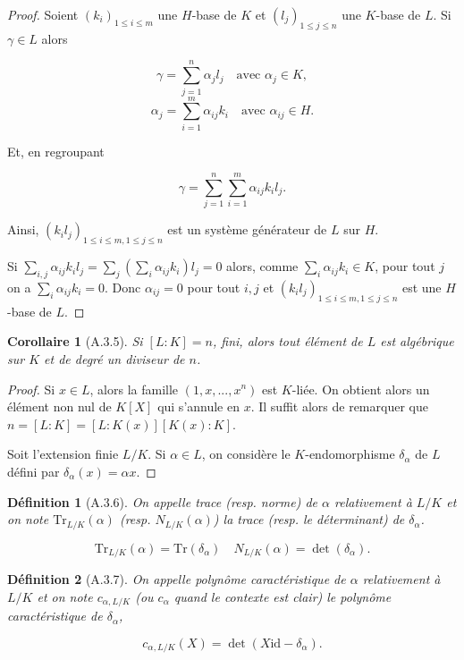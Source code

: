 \documentclass[12pts,a4paper]{report}
\newtheorem{definition}{Définition}
\newtheorem{corollaire}{Corollaire}
\begin{document}
\begin{proof}
Soient \( (k_i)_{1\leq i\leq m} \) une \( H \)-base de \( K \) et \( (l_j)_{1\leq j\leq n} \) une \( K \)-base de \( L \). Si \( \gamma \in L \) alors

\[
\gamma = \sum_{j=1}^n \alpha_j l_j \quad \text{avec } \alpha_j \in K,
\]
\[
\alpha_j = \sum_{i=1}^m \alpha_{ij} k_i \quad \text{avec } \alpha_{ij} \in H.
\]

Et, en regroupant

\[
\gamma = \sum_{j=1}^n \sum_{i=1}^m \alpha_{ij} k_i l_j.
\]

Ainsi, \( (k_i l_j)_{1\leq i\leq m, 1\leq j\leq n} \) est un système générateur de \( L \) sur \( H \).

Si \( \sum_{i,j} \alpha_{ij} k_i l_j = \sum_j (\sum_i \alpha_{ij} k_i) l_j = 0 \) alors, comme \( \sum_i \alpha_{ij} k_i \in K \), pour tout \( j \) on a \( \sum_i \alpha_{ij} k_i = 0 \). Donc \( \alpha_{ij} = 0 \) pour tout \( i, j \) et \( (k_i l_j)_{1\leq i\leq m, 1\leq j\leq n} \) est une \( H \)-base de \( L \). \qedhere
\end{proof}

\begin{corollaire}[A.3.5]
Si \( [L:K] = n \), fini, alors tout élément de \( L \) est algébrique sur \( K \) et de degré un diviseur de \( n \).
\end{corollaire}

\begin{proof}
Si \( x \in L \), alors la famille \( (1,x,...,x^n) \) est \( K \)-liée. On obtient alors un élément non nul de \( K[X] \) qui s'annule en \( x \). Il suffit alors de remarquer que \( n = [L:K] = [L:K(x)][K(x):K] \).

Soit l'extension finie \( L/K \). Si \( \alpha \in L \), on considère le \( K \)-endomorphisme \( \delta_\alpha \) de \( L \) défini par \( \delta_\alpha (x) = \alpha x \). \qedhere
\end{proof}

\begin{definition}[A.3.6]
On appelle trace (resp. norme) de \( \alpha \) relativement à \( L/K \) et on note \( \text{Tr}_{L/K}(\alpha) \) (resp. \( N_{L/K}(\alpha) \)) la trace (resp. le déterminant) de \( \delta_\alpha \).

\[
\text{Tr}_{L/K}(\alpha) = \text{Tr}(\delta_\alpha) \quad N_{L/K}(\alpha) = \det(\delta_\alpha).
\]
\end{definition}

\begin{definition}[A.3.7]
On appelle polynôme caractéristique de \( \alpha \) relativement à \( L/K \) et on note \( c_{\alpha, L/K} \) (ou \( c_\alpha \) quand le contexte est clair) le polynôme caractéristique de \( \delta_\alpha \),

\[
c_{\alpha, L/K}(X) = \det(X\text{id} - \delta_\alpha).
\]
\end{definition}
\end{document}
